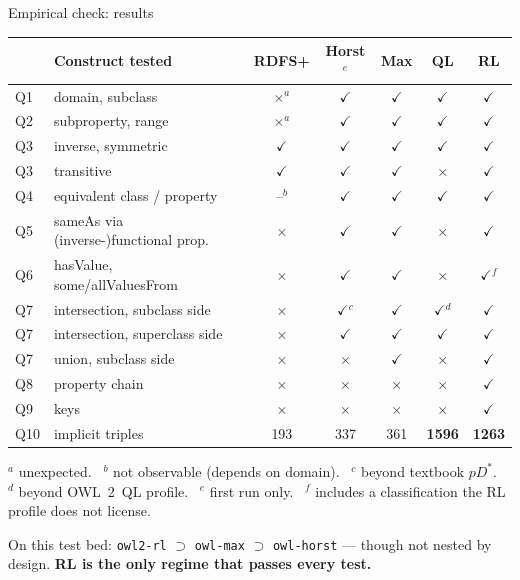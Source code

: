 \documentclass[10pt,aspectratio=169,xcolor=table]{beamer}
\newcommand{\tyes}{\textcolor{okgreen}{$\checkmark$}}
\newcommand{\tno}{\textcolor{nored}{$\times$}}
\newcommand{\hl}[1]{\textcolor{accent}{\textbf{#1}}}
\begin{document}
\begin{frame}{Empirical check: results}
  \centering\scriptsize
  \begin{tabular}{@{}llccccc@{}}
    \toprule
    & \textbf{Construct tested} & \textbf{RDFS+} & \textbf{Horst}$^{e}$ &
      \textbf{Max} & \textbf{QL} & \textbf{RL}\\
    \midrule
    Q1 & domain, subclass                        & \tno$^{a}$ & \tyes & \tyes & \tyes & \tyes\\
    Q2 & subproperty, range                      & \tno$^{a}$ & \tyes & \tyes & \tyes & \tyes\\
    Q3 & inverse, symmetric                      & \tyes & \tyes & \tyes & \tyes & \tyes\\
    Q3 & transitive                              & \tyes & \tyes & \tyes & \tno  & \tyes\\
    Q4 & equivalent class / property             & --$^{b}$ & \tyes & \tyes & \tyes & \tyes\\
    Q5 & sameAs via (inverse-)functional prop.   & \tno & \tyes & \tyes & \tno & \tyes\\
    Q6 & hasValue, some/allValuesFrom            & \tno & \tyes & \tyes & \tno & \tyes$^{f}$\\
    Q7 & intersection, subclass side             & \tno & \tyes$^{c}$ & \tyes & \tyes$^{d}$ & \tyes\\
    Q7 & intersection, superclass side           & \tno & \tyes & \tyes & \tyes & \tyes\\
    Q7 & union, subclass side                    & \tno & \tno & \tyes & \tno & \tyes\\
    Q8 & property chain                          & \tno & \tno & \tno & \tno & \tyes\\
    Q9 & keys                                    & \tno & \tno & \tno & \tno & \tyes\\
    \midrule
    Q10 & implicit triples                       & 193 & 337 & 361 & \textbf{1596} & \textbf{1263}\\
    \bottomrule
  \end{tabular}

  \vspace{4pt}
  \raggedright\tiny
  $^{a}$ unexpected. \ $^{b}$ not observable (depends on domain). \
  $^{c}$ beyond textbook $pD^*$. \ $^{d}$ beyond OWL~2~QL profile. \
  $^{e}$ first run only. \ $^{f}$ includes a classification the RL profile does not license.

  \vspace{4pt}\small
  On this test bed: \texttt{owl2-rl} $\supset$ \texttt{owl-max} $\supset$ \texttt{owl-horst}
  --- though not nested by design. \hl{RL is the only regime that passes every test.}
\end{frame}
\end{document}
